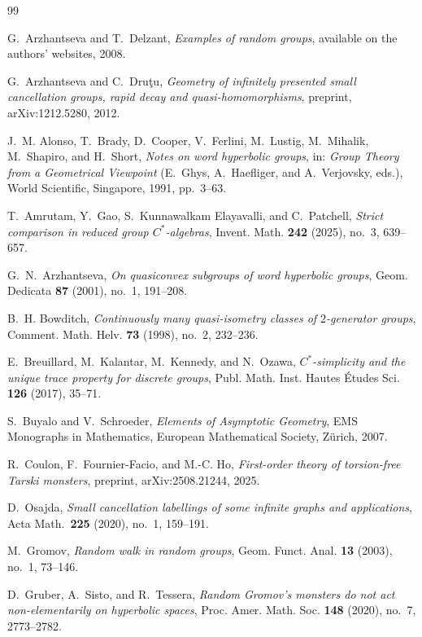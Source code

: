 \documentclass[12pt]{amsart}
\theoremstyle{plain}
\theoremstyle{definition}
\newcommand{\Cstar}{C^*}
\begin{document}
\begin{thebibliography}{99}

G.~Arzhantseva and T.~Delzant,
\textit{Examples of random groups},
available on the authors' websites, 2008.

G.~Arzhantseva and C.~Dru\c{t}u,
\textit{Geometry of infinitely presented small cancellation groups, rapid decay
and quasi-homomorphisms},
preprint, arXiv:1212.5280, 2012.

J.~M. Alonso, T.~Brady, D.~Cooper, V.~Ferlini, M.~Lustig, M.~Mihalik,
M.~Shapiro, and H.~Short,
\textit{Notes on word hyperbolic groups},
in: \textit{Group Theory from a Geometrical Viewpoint} (E.~Ghys, A.~Haefliger,
and A.~Verjovsky, eds.), World Scientific, Singapore, 1991, pp.~3--63.

T.~Amrutam, Y.~Gao, S.~Kunnawalkam Elayavalli, and C.~Patchell,
\textit{Strict comparison in reduced group $\Cstar$-algebras},
Invent. Math. \textbf{242} (2025), no.~3, 639--657.

G.~N.~Arzhantseva,
\textit{On quasiconvex subgroups of word hyperbolic groups},
Geom. Dedicata \textbf{87} (2001), no.~1, 191--208.

B.~H. Bowditch,
\textit{Continuously many quasi-isometry classes of $2$-generator groups},
Comment. Math. Helv. \textbf{73} (1998), no.~2, 232--236.

E.~Breuillard, M.~Kalantar, M.~Kennedy, and N.~Ozawa,
\textit{$\Cstar$-simplicity and the unique trace property for discrete groups},
Publ. Math. Inst. Hautes \'Etudes Sci. \textbf{126} (2017), 35--71.

S.~Buyalo and V.~Schroeder,
\textit{Elements of Asymptotic Geometry},
EMS Monographs in Mathematics, European Mathematical Society, Z\"{u}rich, 2007.

R.~Coulon, F.~Fournier-Facio, and M.-C. Ho,
\textit{First-order theory of torsion-free Tarski monsters},
preprint, arXiv:2508.21244, 2025.

D.~Osajda,
\textit{Small cancellation labellings of some infinite graphs and applications},
Acta Math.\ \textbf{225} (2020), no.~1, 159--191.

M.~Gromov,
\textit{Random walk in random groups},
Geom. Funct. Anal. \textbf{13} (2003), no.~1, 73--146.

D.~Gruber, A.~Sisto, and R.~Tessera,
\textit{Random Gromov's monsters do not act non-elementarily on hyperbolic spaces},
Proc. Amer. Math. Soc. \textbf{148} (2020), no.~7, 2773--2782.


\end{thebibliography}
\end{document}
